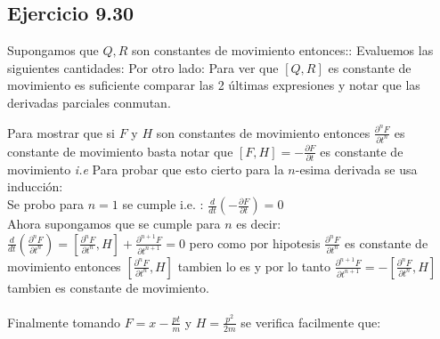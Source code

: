 \subsection*{Ejercicio 9.30}
Supongamos que $Q, R$ son constantes de movimiento entonces::
Evaluemos las siguientes cantidades:
Por otro lado:
Para ver que $[Q,R]$ es constante de movimiento es suficiente comparar las 2 \'ultimas expresiones y notar que las derivadas parciales conmutan.


Para mostrar que si $F$ y $H$ son constantes de movimiento entonces $\frac{\partial^n F}{\partial t^n}$ es constante de movimiento basta notar que $[F,H]=-\frac{\partial F}{\partial t}$ es constante de movimiento \emph{i.e}
Para probar que esto cierto para la $n$-esima derivada se usa inducci\'on:\\
Se probo para $n=1$ se cumple i.e. : $\frac{d}{dt}\left ( -\frac{\partial F}{\partial t} \right)=0$\\
Ahora supongamos que se cumple para $n$ es decir: $\frac{d}{dt}\left (\frac{\partial^n F}{\partial t^n} \right)=[\frac{\partial^n F}{\partial t^n},H]+\frac{\partial^{n+1} F}{\partial t^{n+1}}=0$ pero como por hipotesis $\frac{\partial^n F}{\partial t^n}$ es constante de movimiento entonces $[\frac{\partial^n F}{\partial t^n},H]$ tambien lo es y por lo tanto $\frac{\partial^{n+1} F}{\partial t^{n+1}}=-[\frac{\partial^n F}{\partial t^n},H]$ tambien es constante de movimiento.
\\
\\
Finalmente tomando $F=x-\frac{pt}{m}$ y $H=\frac{p^2}{2m}$ se verifica facilmente que:


